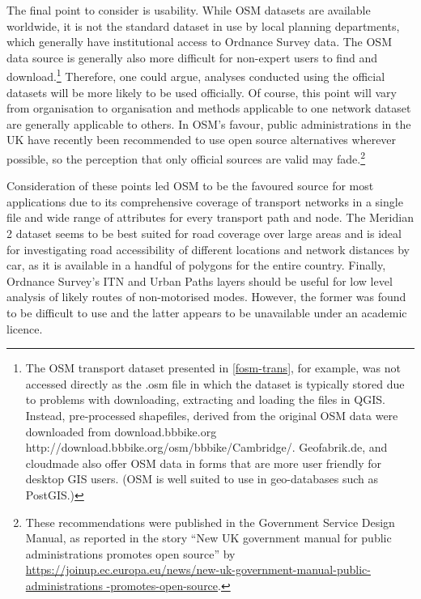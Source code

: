 The final point to consider is usability. While OSM datasets are available
worldwide, it is not the standard dataset in use by local planning departments,
which generally have institutional access to Ordnance Survey data. The 
OSM data source is generally also more difficult for non-expert users to find and
download.\footnote{The
OSM transport dataset presented in \cref{fosm-trans}, for example, was not
accessed directly as the .osm file in which the dataset is typically
stored due to problems with downloading, extracting and loading the files in
QGIS. Instead, pre-processed shapefiles, derived from the original OSM data
were downloaded from
{download.bbbike.org}{
http://download.bbbike.org/osm/bbbike/Cambridge/}. Geofabrik.de, and cloudmade
also offer OSM data in forms that are more user friendly for desktop GIS users.
(OSM is well suited to use in geo-databases such as PostGIS.)} Therefore,
one could argue, analyses conducted using the official datasets will be more
likely to be used officially. Of course, this point will vary from organisation
to organisation and methods applicable to one network dataset are generally
applicable to others. In OSM's favour, public administrations in the UK have
recently been recommended to use open source alternatives wherever possible, so
the perception that only official sources are valid may
fade.\footnote{These
recommendations were published in the Government Service Design Manual, as
reported in the story ``New UK government manual for public administrations
promotes open source'' by \href{https://joinup.ec.europa.eu/}{
https://joinup.ec.europa.eu/news/new-uk-government-manual-public-administrations
-promotes-open-source}.}

Consideration of these points led OSM to be the favoured source for most
applications due to its comprehensive coverage of transport networks in a
single file and wide range of attributes for every transport path and node. The
Meridian 2 dataset seems to be best suited for road coverage over large areas
and is ideal for investigating road accessibility of different locations and
network distances by car, as it is available in a handful of polygons for the
entire country. Finally, Ordnance Survey's ITN and Urban Paths layers should be
useful for low level analysis of likely routes of non-motorised modes. However, the
former was found to be difficult to use
and the latter appears to be unavailable under an academic licence.

